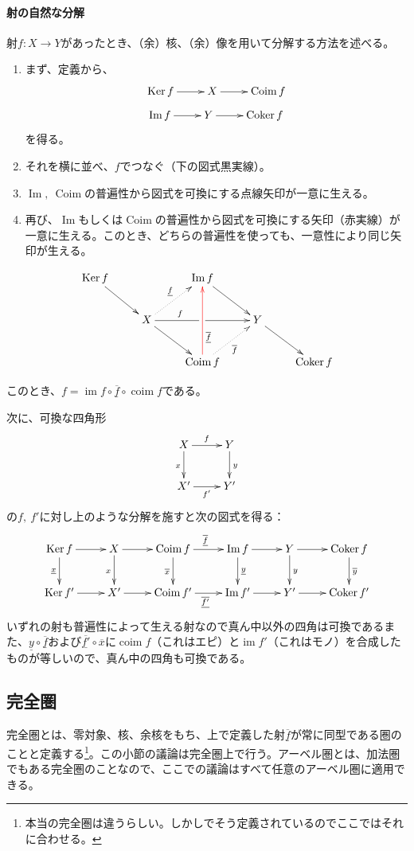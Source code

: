 \documentclass[a4paper,11pt]{jsarticle}
\theoremstyle{definition}
\DeclareMathOperator{\Ima}{\mathrm{Im}}
\DeclareMathOperator{\im}{\mathrm{im}}
\DeclareMathOperator{\Coker}{\mathrm{Coker}}
\DeclareMathOperator{\Coim}{\mathrm{Coim}}
\DeclareMathOperator{\coim}{\mathrm{coim}}
\DeclareMathOperator{\Ker}{\mathrm{Ker}}
\newcommand{\ou}[1]{\overline{\underline{#1}}}
\begin{document}
\paragraph{射の自然な分解}
射$f\colon X \to Y$があったとき、（余）核、（余）像を用いて分解する方法を述べる。
\begin{enumerate}[label=\underline{\textsf{Step \arabic*}}]
  \item まず、定義から、\[\xymatrix{
    \Ker f\ar[r]&X\ar[r]&\Coim f
  }\]\[
  \xymatrix{
    \Ima f\ar[r]&Y\ar[r]&\Coker f
  }
  \]を得る。
  \item それを横に並べ、$f$でつなぐ（下の図式黒実線）。
  \item $\Ima,\ \Coim$の普遍性から図式を可換にする点線矢印が一意に生える。
  \item 再び、$\Ima$もしくは$\Coim$の普遍性から図式を可換にする矢印（赤実線）が一意に生える。このとき、どちらの普遍性を使っても、一意性により同じ矢印が生える。
\end{enumerate}
\begin{equation}\label{diagram:coim_to_im}
  \vcenter{
  \xymatrix{
  \Ker f \ar[rd] & & \Ima f \ar[rd] & & \\
  & X \ar[rd] \ar[rr]^(.3){f}|\hole \ar@{.>}[ru]^{\underline{f}} & & Y \ar[rd] & \\
  & & \Coim f \ar@{.>}[ru]_{\overline{f}} \ar@[red][uu]_(.3){\ou{f}}& & \Coker f
}
}
\end{equation}

このとき、$f=\im f\circ \ou{f}\circ \coim f $である。

次に、可換な四角形\[\xymatrix{
  X\ar[r]^{f}\ar[d]_{x}&Y\ar[d]^{y}\\
  X'\ar[r]_{f'}&Y'
}\]の$f,\ f'$に対し上のような分解を施すと次の図式を得る：\[\xymatrix{
  \Ker f\ar[r]\ar[d]_{\underline{x}}&X\ar[r]\ar[d]_{x}&\Coim f\ar[r]^{\ou{f}}\ar[d]_{\overline{x}}&\Ima f\ar[r]\ar[d]^{\underline{y}}&Y\ar[r]\ar[d]^{y}&\Coker f\ar[d]^{\overline{y}}\\
  \Ker f'\ar[r]&X'\ar[r]&\Coim f'\ar[r]_{\ou{f'}}&\Ima f'\ar[r]&Y'\ar[r]&\Coker f'
}\]いずれの射も普遍性によって生える射なので真ん中以外の四角は可換であるまた、$\underline{y}\circ \ou{f}$および$\ou{f'}\circ \overline{x}$に$\coim f$（これはエピ）と$\im f'$（これはモノ）を合成したものが等しいので、真ん中の四角も可換である。
\subsection{完全圏}
完全圏とは、零対象、核、余核をもち、上で定義した射$\ou{f}$が常に同型である圏のことと定義する\footnote{本当の完全圏は違うらしい。しかし\cite{iversen2012cohomology}でそう定義されているのでここではそれに合わせる。}。この小節の議論は完全圏上で行う。アーベル圏とは、加法圏でもある完全圏のことなので、ここでの議論はすべて任意のアーベル圏に適用できる。
\end{document}
